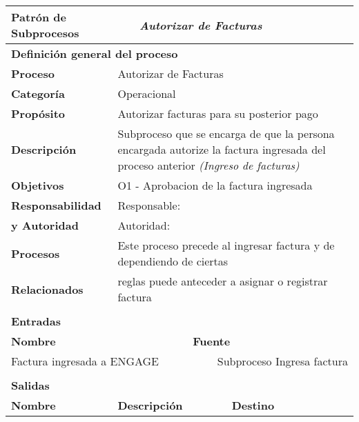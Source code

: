 \begin{longtable}{|llrrrrrr|}
	\hline
	\multicolumn{2}{|l|}{\textbf{Patrón de Subprocesos}} & \multicolumn{6}{|l|}{\textit{Autorizar de Facturas}} \\ \hline
	\multicolumn{8}{|l|}{\textbf{Definición general del proceso}} \\ \hline
	\textbf{Proceso} & \multicolumn{7}{|m{12cm}|}{Autorizar de Facturas} \\ \hline
	\textbf{Categoría} & \multicolumn{7}{|m{12cm}|}{Operacional} \\ \hline
	\textbf{Propósito} & \multicolumn{7}{|m{12cm}|}{Autorizar facturas para su posterior pago} \\ \hline
    \textbf{Descripción} & \multicolumn{7}{|m{12cm}|}{Subproceso que se encarga de que la persona encargada autorize la factura ingresada del proceso anterior \textit{(Ingreso de facturas)}} \\ \hline
	\multirow{0}[6]{*}{\textbf{Objetivos}} 
          & \multicolumn{7}{|l|}{O1 -  Aprobacion de la factura ingresada} \\ \hline
    \multicolumn{1}{|l|}{\textbf{Responsabilidad}} 	& \multicolumn{7}{|l|}{Responsable: } \\
	\multicolumn{1}{|l|}{\textbf{y Autoridad}} 	& \multicolumn{7}{|l|}{Autoridad: } \\ \hline
    \multicolumn{1}{|l|}{\textbf{Procesos}} 	& \multicolumn{7}{|m{12cm}|}{Este proceso precede al ingresar factura y de dependiendo de ciertas } \\
	\multicolumn{1}{|l|}{\textbf{Relacionados}} 	&  \multicolumn{7}{|m{12cm}|}{reglas puede anteceder a asignar o registrar factura} \\ \hline
          &       &       &       &       &       &       &  \\ \hline
    \multicolumn{8}{|l|}{\textbf{Entradas}} \\ \hline
    \multicolumn{5}{|l|}{\textbf{Nombre}}   & \multicolumn{3}{|l|}{\textbf{Fuente}} \\ \hline
    \multicolumn{5}{|l|}{Factura ingresada a ENGAGE} & \multicolumn{3}{|m{3.5cm}|}{Subproceso Ingresa factura} \\  \hline
       &       &       &       &       &       &       &  \\ \hline
    \multicolumn{8}{|l|}{\textbf{Salidas}} \\ \hline
    \textbf{Nombre} & \multicolumn{5}{|l|}{\textbf{Descripción}} & \multicolumn{2}{|l|}{\textbf{Destino}} \\ \hline

\end{longtable}
